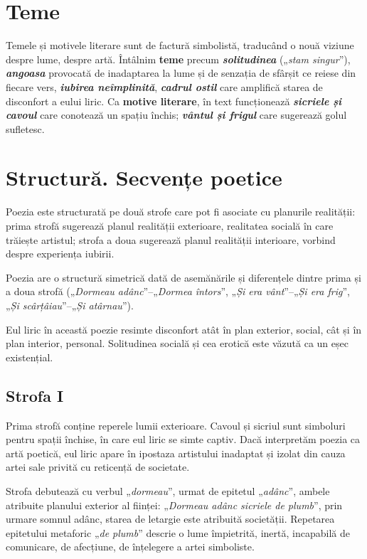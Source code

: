 \documentclass{article}
\newcommand{\qu}[1]{„\emph{#1}”}
\begin{document}
\section{Teme}
Temele și motivele literare sunt de factură simbolistă, traducând o nouă viziune despre lume, despre artă. Întâlnim \textbf{teme} precum \textsl{\textbf{solitudinea}} (\qu{stam singur}), \textsl{\textbf{angoasa}} provocată de inadaptarea la lume și de senzația de sfârșit ce reiese din fiecare vers, \textsl{\textbf{iubirea neîmplinită}}, \textsl{\textbf{cadrul ostil}} care amplifică starea de disconfort a eului liric. Ca \textbf{motive literare}, în text funcționează \textsl{\textbf{sicriele și cavoul}} care conotează un spațiu închis; \textsl{\textbf{vântul și frigul}} care sugerează golul sufletesc.

\section{Structură. Secvențe poetice}
Poezia este structurată pe două strofe care pot fi asociate cu planurile realității: prima strofă sugerează planul realității exterioare, realitatea socială în care trăiește artistul; strofa a doua sugerează planul realității interioare, vorbind despre experiența iubirii.

Poezia are o structură simetrică dată de asemănările și diferențele dintre prima și a doua strofă (\qu{Dormeau adânc}--\qu{Dormea întors}, \qu{Și era vânt}--\qu{Și era frig}, \qu{Și scârțâiau}--\qu{Și atârnau}).

Eul liric în această poezie resimte disconfort atât în plan exterior, social, cât și în plan interior, personal. Solitudinea socială și cea erotică este văzută ca un eșec existențial.

\subsection{Strofa I}
Prima strofă conține reperele lumii exterioare. Cavoul și sicriul sunt simboluri pentru spații închise, în care eul liric se simte captiv. Dacă interpretăm poezia ca artă poetică, eul liric apare în ipostaza artistului inadaptat și izolat din cauza artei sale privită cu reticență de societate.

Strofa debutează cu verbul \qu{dormeau}, urmat de epitetul \qu{adânc}, ambele atribuite planului exterior al ființei: \qu{Dormeau adânc sicriele de plumb}, prin urmare somnul adânc, starea de letargie este atribuită societății. Repetarea epitetului metaforic \qu{de plumb} descrie o lume  împietrită, inertă, incapabilă de comunicare, de afecțiune, de înțelegere a artei simboliste.
\end{document}
